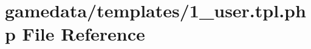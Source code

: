 \hypertarget{1__user_8tpl_8php}{\section{gamedata/templates/1\+\_\+user.tpl.\+php File Reference}
\label{1__user_8tpl_8php}
}
